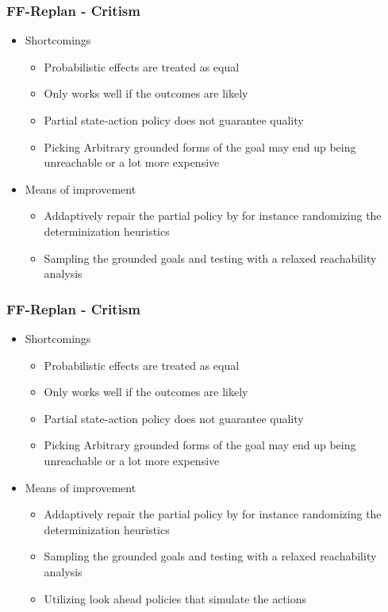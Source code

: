 \documentclass{beamer}
\let\origframetitle=\frametitle
\renewcommand\frametitle[1]{\origframetitle{\textbf{\large{\textrm{#1}}}}}
\begin{document}
\begin{frame}
  \frametitle{FF-Replan - Critism}
  \begin{itemize}
    \item Shortcomings
      \begin{itemize}
        \item Probabilistic effects are treated as equal
        \item Only works well if the outcomes are likely
	\item Partial state-action policy does not guarantee quality
	\item Picking Arbitrary grounded forms of the goal may end up being unreachable or a lot more expensive
      \end{itemize}
    \item Means of improvement
      \begin{itemize}
        \item Addaptively repair the partial policy by for instance randomizing the determinization heuristics 
	\item Sampling the grounded goals and testing with a relaxed reachability analysis
      \end{itemize}
   \end{itemize}
\end{frame}




\begin{frame}
  \frametitle{FF-Replan - Critism}
  \begin{itemize}
    \item Shortcomings
      \begin{itemize}
        \item Probabilistic effects are treated as equal
        \item Only works well if the outcomes are likely
	\item Partial state-action policy does not guarantee quality
	\item Picking Arbitrary grounded forms of the goal may end up being unreachable or a lot more expensive
      \end{itemize}
    \item Means of improvement
      \begin{itemize}
        \item Addaptively repair the partial policy by for instance randomizing the determinization heuristics 
	\item Sampling the grounded goals and testing with a relaxed reachability analysis
	\item Utilizing look ahead policies that simulate the actions
      \end{itemize}
   \end{itemize}
\end{frame}
\end{document}
